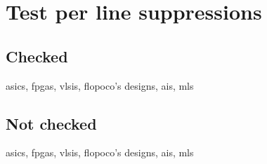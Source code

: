 \documentclass{article}
\begin{document}
\section{Test per line suppressions}

\subsection{Checked}
asics, fpgas, vlsis, flopoco's designs, ais, mls

\subsection{Not checked}
asics, fpgas, vlsis, flopoco's designs, ais, mls %
\end{document}
